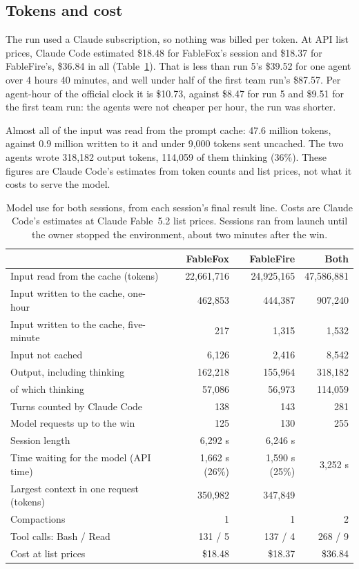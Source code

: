 \documentclass[11pt,a4paper]{article}
\begin{document}
\subsection{Tokens and cost}

The run used a Claude subscription, so nothing was billed per token. At API list prices, Claude Code estimated \$18.48 for FableFox's session and \$18.37 for FableFire's, \$36.84 in all (Table~\ref{tab:cost}). That is less than run 5's \$39.52 for one agent over 4 hours 40 minutes, and well under half of the first team run's \$87.57. Per agent-hour of the official clock it is \$10.73, against \$8.47 for run 5 and \$9.51 for the first team run: the agents were not cheaper per hour, the run was shorter.

Almost all of the input was read from the prompt cache: 47.6 million tokens, against 0.9 million written to it and under 9,000 tokens sent uncached. The two agents wrote 318,182 output tokens, 114,059 of them thinking (36\%). These figures are Claude Code's estimates from token counts and list prices, not what it costs to serve the model.

\begin{table}[t]
  \caption{Model use for both sessions, from each session's final result line. Costs are Claude Code's estimates at Claude Fable~5.2 list prices. Sessions ran from launch until the owner stopped the environment, about two minutes after the win.}
  \label{tab:cost}
  \small
  \begin{tabularx}{\textwidth}{@{}Xrrr@{}}
    \toprule
    & \textbf{FableFox} & \textbf{FableFire} & \textbf{Both} \\
    \midrule
    Input read from the cache (tokens) & 22,661,716 & 24,925,165 & 47,586,881 \\
    Input written to the cache, one-hour & 462,853 & 444,387 & 907,240 \\
    Input written to the cache, five-minute & 217 & 1,315 & 1,532 \\
    Input not cached & 6,126 & 2,416 & 8,542 \\
    Output, including thinking & 162,218 & 155,964 & 318,182 \\
    \quad of which thinking & 57,086 & 56,973 & 114,059 \\
    \midrule
    Turns counted by Claude Code & 138 & 143 & 281 \\
    Model requests up to the win & 125 & 130 & 255 \\
    Session length & 6,292 s & 6,246 s & \\
    Time waiting for the model (API time) & 1,662 s (26\%) & 1,590 s (25\%) & 3,252 s \\
    Largest context in one request (tokens) & 350,982 & 347,849 & \\
    Compactions & 1 & 1 & 2 \\
    Tool calls: Bash / Read & 131 / 5 & 137 / 4 & 268 / 9 \\
    \midrule
    Cost at list prices & \$18.48 & \$18.37 & \$36.84 \\
    \bottomrule
  \end{tabularx}
\end{table}
\end{document}
